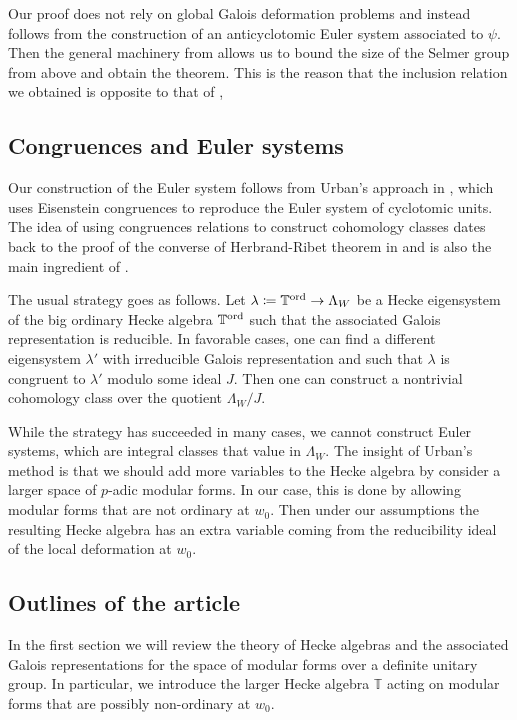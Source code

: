 \documentclass[leqno]{amsart}
\theoremstyle{definition}
\theoremstyle{remark}
\newcommand{\TT}{\mathbb{T}} %
\newcommand{\ord}{\textnormal{ord}} %
\begin{document}
Our proof does not rely on global Galois deformation problems
and instead follows from the construction of 
an anticyclotomic Euler system associated to $\psi$.
Then the general machinery from \cite{Rubin}
allows us to bound the size
of the Selmer group from above and obtain the theorem.
This is the reason that the inclusion relation
we obtained is opposite to that of \cite{HT94},



\subsection*{Congruences and Euler systems}

Our construction of the Euler system
follows from Urban's approach in \cite{urban},
which uses Eisenstein congruences 
to reproduce the Euler system of cyclotomic units.
The idea of using congruences relations to construct cohomology classes
dates back to the proof of the converse of
Herbrand-Ribet theorem in \cite{Ribet1976}
and is also the main ingredient of \cite{HT93}.

The usual strategy goes as follows.
Let $\lambda\coloneqq \TT^{\ord}\to \Lambda_W$
be a Hecke eigensystem
of the big ordinary Hecke algebra $\TT^{\ord}$
such that the associated Galois representation is reducible.
In favorable cases, one can find a different eigensystem
$\lambda'$ with irreducible Galois representation and such that
$\lambda$ is congruent to $\lambda'$ modulo some ideal $J$.
Then one can construct 
a nontrivial cohomology class over the quotient $\Lambda_W/J$.


While the strategy has succeeded in many cases,
we cannot construct Euler systems,
which are integral classes that value in $\Lambda_W$.
The insight of Urban's method is that we should add more variables
to the Hecke algebra by consider a larger space of $p$-adic modular forms.
In our case, this is done by allowing modular forms
that are not ordinary at $w_0$.
Then under our assumptions the resulting Hecke algebra
has an extra variable coming from the reducibility ideal
of the local deformation at $w_0$.

\subsection{Outlines of the article}

In the first section we will review 
the theory of Hecke algebras and the associated Galois representations 
for the space of modular forms over a definite unitary group.
In particular, we introduce the larger Hecke algebra $\TT$
acting on modular forms that are possibly non-ordinary at $w_0$.
\end{document}
